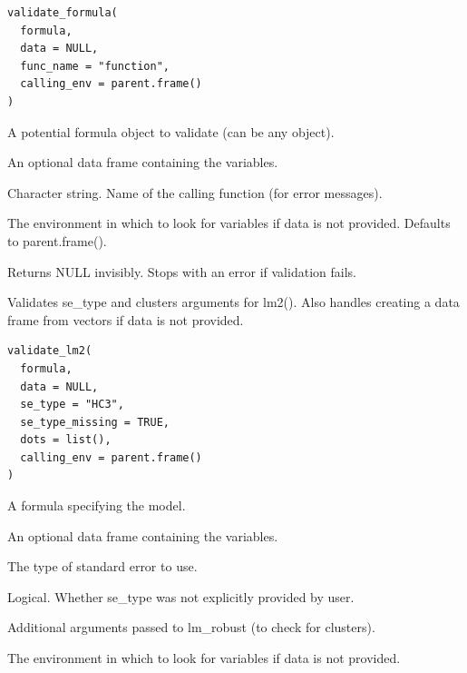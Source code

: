 \documentclass[a4paper]{book}
\begin{document}
%
\begin{Usage}
\begin{verbatim}
validate_formula(
  formula,
  data = NULL,
  func_name = "function",
  calling_env = parent.frame()
)
\end{verbatim}
\end{Usage}
%
\begin{Arguments}
\begin{ldescription}
\item[\code{formula}] A potential formula object to validate (can be any object).

\item[\code{data}] An optional data frame containing the variables.

\item[\code{func\_name}] Character string. Name of the calling function (for error messages).

\item[\code{calling\_env}] The environment in which to look for variables if data is not provided.
Defaults to parent.frame().
\end{ldescription}
\end{Arguments}
%
\begin{Value}
Returns NULL invisibly. Stops with an error if validation fails.
\end{Value}
%
\begin{Description}
Validates se\_type and clusters arguments for lm2().
Also handles creating a data frame from vectors if data is not provided.
\end{Description}
%
\begin{Usage}
\begin{verbatim}
validate_lm2(
  formula,
  data = NULL,
  se_type = "HC3",
  se_type_missing = TRUE,
  dots = list(),
  calling_env = parent.frame()
)
\end{verbatim}
\end{Usage}
%
\begin{Arguments}
\begin{ldescription}
\item[\code{formula}] A formula specifying the model.

\item[\code{data}] An optional data frame containing the variables.

\item[\code{se\_type}] The type of standard error to use.

\item[\code{se\_type\_missing}] Logical. Whether se\_type was not explicitly provided by user.

\item[\code{dots}] Additional arguments passed to lm\_robust (to check for clusters).

\item[\code{calling\_env}] The environment in which to look for variables if data is not provided.
\end{ldescription}
\end{Arguments}
\end{document}
